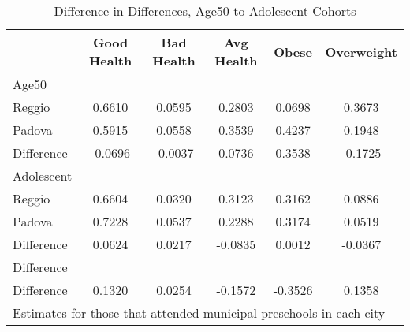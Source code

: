 \begin{table}[htbp]\centering
\caption{Difference in Differences, Age50 to Adolescent Cohorts}
\begin{tabular}{l*{5}{c}}
\hline\hline
            & Good Health&  Bad Health&  Avg Health&       Obese&  Overweight\\
\hline
Age50       &            &            &            &            &            \\
Reggio      &      0.6610&      0.0595&      0.2803&      0.0698&      0.3673\\
Padova      &      0.5915&      0.0558&      0.3539&      0.4237&      0.1948\\
Difference  &     -0.0696&     -0.0037&      0.0736&      0.3538&     -0.1725\\
\hline
Adolescent  &            &            &            &            &            \\
Reggio      &      0.6604&      0.0320&      0.3123&      0.3162&      0.0886\\
Padova      &      0.7228&      0.0537&      0.2288&      0.3174&      0.0519\\
Difference  &      0.0624&      0.0217&     -0.0835&      0.0012&     -0.0367\\
\hline
Difference  &            &            &            &            &            \\
Difference  &      0.1320&      0.0254&     -0.1572&     -0.3526&      0.1358\\
\hline\hline
\multicolumn{6}{l}{\footnotesize Estimates for those that attended municipal preschools in each city}\\
\end{tabular}
\end{table}
